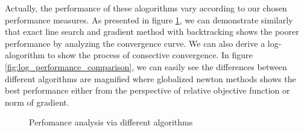 Actually, the performance of these alogorithms vary according to our chosen performance measures. As presented in figure \ref{fig:performance_comparison}, we can demonstrate similarly that exact line search and gradient method with backtracking shows the poorer performance by analyzing the convergence curve. We can also derive a log-alogorithm to show the process of consective convergence. In figure \ref{fig:log_performance_comparison}, we can easily see the differences between different algorithms are magnified where globalized newton methods shows the best performance either from the perspective of relative objective function or norm of gradient.
\begin{figure}[!htbp]
    \centering
    \caption{Perfomance analysis via different algorithms}
    \label{fig:performance_comparison}  
\end{figure}

